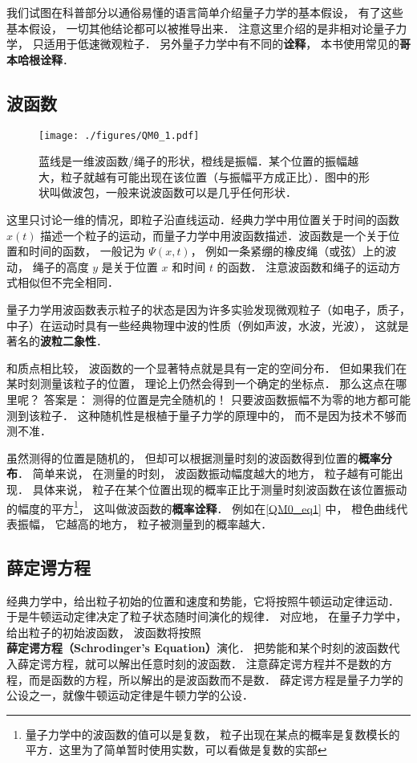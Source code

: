 

我们试图在科普部分以通俗易懂的语言简单介绍量子力学的基本假设， 有了这些基本假设， 一切其他结论都可以被推导出来． 注意这里介绍的是非相对论量子力学， 只适用于低速微观粒子． 另外量子力学中有不同的\textbf{诠释}， 本书使用常见的\textbf{哥本哈根诠释}．

\subsection{波函数}

\begin{figure}[ht]
\centering
\texttt{[image: ./figures/QM0\_1.pdf]}
\caption{蓝线是一维波函数/绳子的形状，橙线是振幅．某个位置的振幅越大，粒子就越有可能出现在该位置（与振幅平方成正比）．图中的形状叫做波包，一般来说波函数可以是几乎任何形状．} \label{QM0_fig1}
\end{figure}

这里只讨论一维的情况，即粒子沿直线运动．经典力学中用位置关于时间的函数 $x(t)$ 描述一个粒子的运动，而量子力学中用波函数描述．波函数是一个关于位置和时间的函数， 一般记为 $\Psi(x, t)$， 例如一条紧绷的橡皮绳（或弦）上的波动， 绳子的高度 $y$ 是关于位置 $x$ 和时间 $t$ 的函数． 注意波函数和绳子的运动方式相似但不完全相同．

量子力学用波函数表示粒子的状态是因为许多实验发现微观粒子（如电子，质子，中子）在运动时具有一些经典物理中波的性质（例如声波，水波，光波）， 这就是著名的\textbf{波粒二象性}．

和质点相比较， 波函数的一个显著特点就是具有一定的空间分布． 但如果我们在某时刻测量该粒子的位置， 理论上仍然会得到一个确定的坐标点． 那么这点在哪里呢？ 答案是： 测得的位置是完全随机的！ 只要波函数振幅不为零的地方都可能测到该粒子． 这种随机性是根植于量子力学的原理中的， 而不是因为技术不够而测不准．

虽然测得的位置是随机的， 但却可以根据测量时刻的波函数得到位置的\textbf{概率分布}． 简单来说， 在测量的时刻， 波函数振动幅度越大的地方， 粒子越有可能出现． 具体来说， 粒子在某个位置出现的概率正比于测量时刻波函数在该位置振动的幅度的平方\footnote{量子力学中的波函数的值可以是复数， 粒子出现在某点的概率是复数模长的平方．这里为了简单暂时使用实数，可以看做是复数的实部}， 这叫做波函数的\textbf{概率诠释}． 例如在\autoref{QM0_eq1} 中， 橙色曲线代表振幅， 它越高的地方， 粒子被测量到的概率越大．

\subsection{薛定谔方程}
经典力学中，给出粒子初始的位置和速度和势能，它将按照牛顿运动定律运动． 于是牛顿运动定律决定了粒子状态随时间演化的规律． 对应地， 在量子力学中， 给出粒子的初始波函数， 波函数将按照\textbf{薛定谔方程（Schrodinger's Equation）}演化． 把势能和某个时刻的波函数代入薛定谔方程，就可以解出任意时刻的波函数． 注意薛定谔方程并不是数的方程，而是函数的方程，所以解出的是波函数而不是数． 薛定谔方程是量子力学的公设之一，就像牛顿运动定律是牛顿力学的公设．

